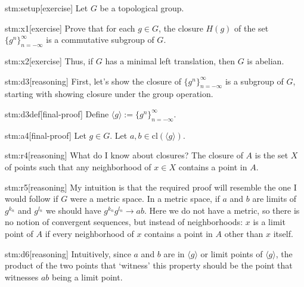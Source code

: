 \documentclass{article}
\begin{document}

\begin{stm}{stm:setup}[exercise]
Let $G$ be a topological group.  
\end{stm}

\begin{stm}{stm:x1}[exercise]
Prove that for each $g \in G$, the closure $H(g)$ of the set $\{g^n\}_{n=-\infty}^\infty$ is a commutative subgroup of $G$.
\end{stm}

\begin{stm}{stm:x2}[exercise]
Thus, if $G$ has a minimal left translation, then $G$ is abelian.
\end{stm}


\begin{stm}{stm:d3}[reasoning]
First, let's show the closure of $\{g^n\}_{n=-\infty}^\infty$ is a subgroup of $G$, starting with showing closure under the group operation.
\end{stm}

\begin{stm}{stm:d3def}[final-proof]
Define ${\langle g \rangle} := \{g^n\}_{n=-\infty}^\infty$.
\end{stm}

\begin{stm}{stm:a4}[final-proof]
Let $g \in G$. Let $a, b \in \mathrm{cl}({\langle g \rangle})$.
\end{stm}

\begin{stm}{stm:r4}[reasoning]
What do I know about closures? The closure of $A$ is the set $X$ of points such that any neighborhood of $x \in X$ contains a point in $A$.
\end{stm}

\begin{stm}{stm:r5}[reasoning]
My intuition is that the required proof will resemble the one I would follow if $G$ were a metric space. In a metric space, if $a$ and $b$ are limits of $g^{k_n}$ and $g^{l_n}$ we should have $g^{k_n} g^{l_n} \to ab$. Here we do not have a metric, so there is no notion of convergent sequences, but instead of neighborhoods: $x$ is a limit point of $A$ if every neighborhood of $x$ contains a point in $A$ other than $x$ itself.
\end{stm}

\begin{stm}{stm:d6}[reasoning]
Intuitively, since $a$ and $b$ are in ${\langle g \rangle}$ or limit points of ${\langle g \rangle}$, the product of the two points that ‘witness’ this property should be the point that witnesses $ab$ being a limit point.
\end{stm}
\end{document}
